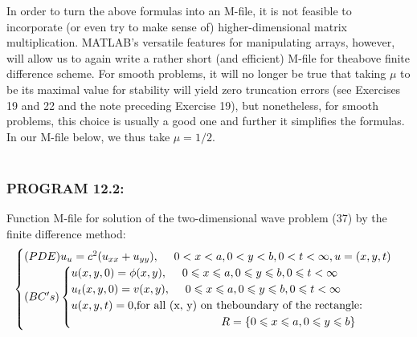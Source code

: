 \documentclass[../main.tex]{subfiles}
\begin{document}
In order to turn the above formulas into an M-file, it is not feasible to incorporate (or even try to make sense of) higher-dimensional matrix multiplication. MATLAB's versatile features for manipulating arrays, however, will allow us to again write a rather short (and efficient) M-file for theabove finite difference scheme. For smooth problems, it will no longer be true that taking $\mu$ to be its maximal value for stability will yield zero truncation errors (see Exercises 19 and 22 and the note preceding Exercise 19), but nonetheless, for smooth problems, this choice is usually a good one and further it simplifies the formulas. In our M-file below, we thus take $\mu = 1 / 2$. 
\\
\\
\subsubsection{PROGRAM 12.2:} Function M-file for solution of the two-dimensional wave problem (37) 
by the finite difference method:
\begin{equation}
	\begin{cases} 
	(PDE) u_u=c^2 (u_{xx}+u_{yy}),~~~~0<x<a, 0<y<b,0<t<\infty,u=(x,y,t)\\
(BC's)
		\begin{cases}
		u(x,y,0)=\phi(x,y), ~~~~ 0\leqslant x \leqslant a,0\leqslant y \leqslant b, 0 \leqslant t< \infty \\
		u_t(x,y,0)=v(x,y), ~~~~ 0\leqslant x \leqslant a,0\leqslant y \leqslant b, 0 \leqslant t< \infty \\
		 u(x, y, t) = 0, $for all (x, y) on theboundary of the rectangle:$\\
		 ~~~~~~~~~~~~~~~~~~~~~~~~~~~~~~~~~~~~~~~~ R= \lbrace 0\leqslant x\leqslant a, 0\leqslant y \leqslant b \rbrace
		\end{cases} 
	\end{cases}
\end{equation}
\end{document}
